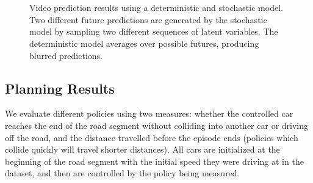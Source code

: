\documentclass{article} %
\begin{document}
\begin{figure}[t!]
    \centering
     \\
     \\
    \label{prediction-results}
    \caption{Video prediction results using a deterministic and stochastic model. Two different future predictions are generated by the stochastic model by sampling two different sequences of latent variables. The deterministic model averages over possible futures, producing blurred predictions.}
\end{figure}









    \subsection{Planning Results}

    We evaluate different policies using two measures: whether the controlled car reaches the end of the road segment without colliding into another car or driving off the road, and the distance travelled before the episode ends (policies which collide quickly will travel shorter distances). All cars are initialized at the beginning of the road segment with the initial speed they were driving at in the dataset, and then are controlled by the policy being measured.
\end{document}

